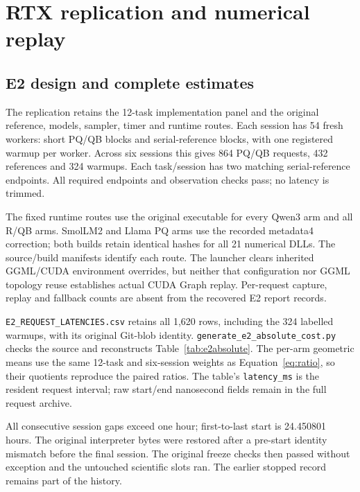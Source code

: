 \section{RTX replication and numerical replay}
\label{supp:cuda}
\subsection{E2 design and complete estimates}
The replication retains the 12-task implementation panel and the original reference, models, sampler, timer and runtime routes. Each session has 54 fresh workers: short PQ/QB blocks and serial-reference blocks, with one registered warmup per worker. Across six sessions this gives 864 PQ/QB requests, 432 references and 324 warmups. Each task/session has two matching serial-reference endpoints. All required endpoints and observation checks pass; no latency is trimmed.

The fixed runtime routes use the original executable for every Qwen3 arm and all R/QB arms. SmolLM2 and Llama PQ arms use the recorded metadata4 correction; both builds retain identical hashes for all 21 numerical DLLs. The source/build manifests identify each route. The launcher clears inherited GGML/CUDA environment overrides, but neither that configuration nor GGML topology reuse establishes actual CUDA Graph replay. Per-request capture, replay and fallback counts are absent from the recovered E2 report records.

\texttt{E2\_REQUEST\_LATENCIES.csv} retains all 1,620 rows, including the 324 labelled warmups, with its original Git-blob identity. \texttt{generate\_e2\_absolute\_cost.py} checks the source and reconstructs Table~\ref{tab:e2absolute}. The per-arm geometric means use the same 12-task and six-session weights as Equation~\ref{eq:ratio}, so their quotients reproduce the paired ratios. The table's \texttt{latency\_ms} is the resident request interval; raw start/end nanosecond fields remain in the full request archive.

All consecutive session gaps exceed one hour; first-to-last start is 24.450801 hours. The original interpreter bytes were restored after a pre-start identity mismatch before the final session. The original freeze checks then passed without exception and the untouched scientific slots ran. The earlier stopped record remains part of the history.

